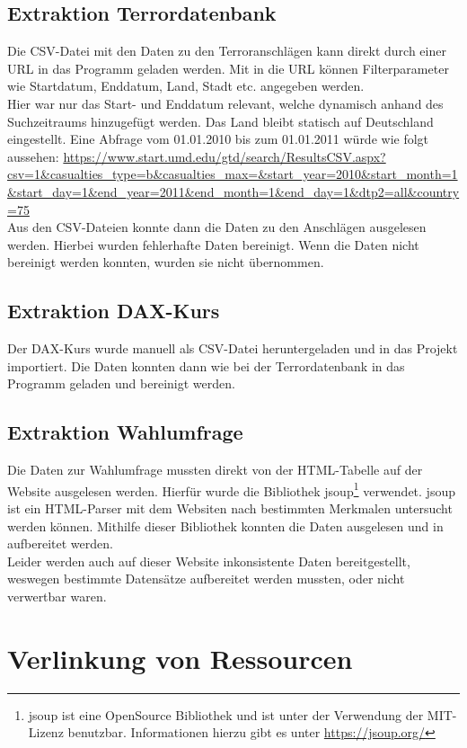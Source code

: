 \documentclass[a4paper,10pt,parskip]{article}
\begin{document}
\subsection{Extraktion Terrordatenbank}
Die CSV-Datei mit den Daten zu den Terroranschlägen kann direkt durch einer URL in das Programm geladen werden. Mit in die URL können Filterparameter wie Startdatum, Enddatum, Land, Stadt etc. angegeben werden.\\
Hier war nur das Start- und Enddatum relevant, welche dynamisch anhand des Suchzeitraums hinzugefügt werden. Das Land bleibt statisch auf Deutschland eingestellt.
Eine Abfrage vom 01.01.2010 bis zum 01.01.2011 würde wie folgt aussehen: \url{https://www.start.umd.edu/gtd/search/ResultsCSV.aspx?csv=1&casualties_type=b&casualties_max=&start_year=2010&start_month=1&start_day=1&end_year=2011&end_month=1&end_day=1&dtp2=all&country=75}
\\
Aus den CSV-Dateien konnte dann die Daten zu den Anschlägen ausgelesen werden. Hierbei wurden fehlerhafte Daten bereinigt. Wenn die Daten nicht bereinigt werden konnten, wurden sie nicht übernommen.
\subsection{Extraktion DAX-Kurs}
Der DAX-Kurs wurde manuell als CSV-Datei heruntergeladen und in das Projekt importiert.
Die Daten konnten dann wie bei der Terrordatenbank in das Programm geladen und bereinigt werden.\\
\subsection{Extraktion Wahlumfrage}
Die Daten zur Wahlumfrage mussten direkt von der HTML-Tabelle auf der Website ausgelesen werden. Hierfür wurde die Bibliothek jsoup\footnote{jsoup ist eine OpenSource Bibliothek und ist unter der Verwendung der MIT-Lizenz benutzbar. Informationen hierzu gibt es unter \url{https://jsoup.org/}} verwendet. jsoup ist ein HTML-Parser mit dem Websiten nach bestimmten Merkmalen untersucht werden können. Mithilfe dieser Bibliothek konnten die Daten ausgelesen und in aufbereitet werden.\\ Leider werden auch auf dieser Website inkonsistente Daten bereitgestellt, weswegen bestimmte Datensätze aufbereitet werden mussten, oder nicht verwertbar waren.

\section{Verlinkung von Ressourcen}
\end{document}
